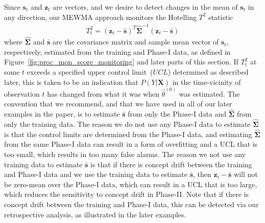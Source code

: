 \documentclass[twoside,11pt]{article}
\begin{document}
Since $\bm{s}_t$ and $\bm{z}_t$ are vectors, and we desire to detect changes in the mean of $\bm{s}_t$ in any direction, our MEWMA approach monitors the Hotelling $T^2$ statistic 
\begin{align}
T_t^2 = (\bm {z}_t-\bar { \bm {s}})^T \widehat {\bm { \Sigma}} ^{-1}(\bm {z}_t-\bar { \bm {s}})
\label{eqn:hotellingt2}
\end{align}
where $\widehat {\bm { \Sigma}}$ and $\bar {\bm{s}}$ are the covariance matrix and sample mean vector of $\bm {s}_t$, respectively, estimated from the training and Phase-I data, as defined in Figure~\ref{fig:proc_mon_score_monitoring} and later parts of this section. If $T_t^2$ at some $t$ exceeds a specified upper control limit~($UCL$) determined as described later, this is taken to be an indication that $P(Y|\bm{X})$ in the time-vicinity of observation $t$ has changed from what it was when $\hat{\theta}^{(0)}$ was estimated. The convention that we recommend, and that we have used in all of our later examples in the paper, is to estimate $\bar {\bm{s}}$ from only the Phase-I data and $\widehat {\bm { \Sigma}}$ from only the training data. The reason we do not use any Phase-I data to estimate $\widehat {\bm { \Sigma}}$ is that the control limits are determined from the Phase-I data, and estimating $\widehat {\bm { \Sigma}}$ from the same Phase-I data can result in a form of overfitting and a UCL that is too small, which results in too many false alarms. The reason we not use any training data to estimate $\bar {\bm{s}}$ is that if there is concept drift between the training and Phase-I data and we use the training data to estimate $\bar { \bm {s}}$, then $\bm {z}_t-\bar { \bm {s}}$ will not be zero-mean over the Phase-I data, which can result in a UCL that is too large, which reduces the sensitivity to concept drift in Phase-II. Note that if there is concept drift between the training and Phase-I data, this can be detected via our retrospective analysis, as illustrated in the later examples. 
\end{document}
